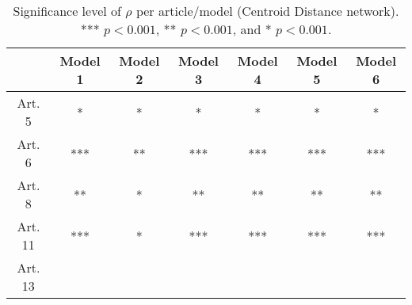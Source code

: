 \begin{table}[ht]
\centering
\begin{tabular}{ccccccc}
  \toprule
 & Model 1 & Model 2 & Model 3 & Model 4 & Model 5 & Model 6 \\ 
  \midrule
Art. 5 & * & * & * & * & * & * \\ 
   \midrule
Art. 6 & *** & ** & *** & *** & *** & *** \\ 
   \midrule
Art. 8 & ** & * & ** & ** & ** & ** \\ 
   \midrule
Art. 11 & *** & * & *** & *** & *** & *** \\ 
   \midrule
Art. 13 &   &   &   &   &   &   \\ 
   \bottomrule
\end{tabular}
\caption{Significance level of $\rho$ per article/model (Centroid Distance network). *** $p < 0.001$, ** $p < 0.001$, and * $p < 0.001$.} 
\end{table}
